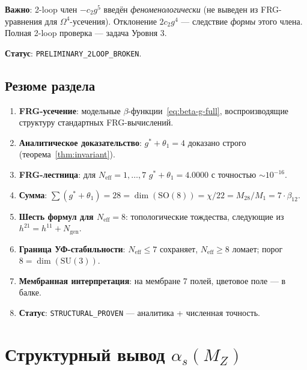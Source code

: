 \documentclass[11pt,a4paper]{article}
\newcommand{\SU}{\ensuremath{\mathrm{SU}}}
\newcommand{\SO}{\ensuremath{\mathrm{SO}}}
\newcommand{\Om}{\ensuremath{\Omega^4}}
\theoremstyle{definition}
\begin{document}
\medskip\noindent
\textbf{Важно}: 2-loop член $-c_2 g^5$ введён \emph{феноменологически}
(не выведен из FRG-уравнения для $\Om$-усечения). Отклонение
$2c_2 g^4$ — следствие \emph{формы} этого члена.
Полная 2-loop проверка — задача Уровня 3.

\medskip\noindent
\textbf{Статус}: \texttt{PRELIMINARY\_2LOOP\_BROKEN}.

\subsection{Резюме раздела}
\label{subsec:frg-summary}

\begin{enumerate}
    \item \textbf{FRG-усечение}: модельные $\beta$-функции~\eqref{eq:beta-g-full},
          воспроизводящие структуру стандартных FRG-вычислений.
    \item \textbf{Аналитическое доказательство}: $g^* + \theta_1 = 4$
          доказано строго (теорема~\ref{thm:invariant}).
    \item \textbf{FRG-лестница}: для $N_{\text{eff}} = 1, \ldots, 7$
          $g^* + \theta_1 = 4.0000$ с точностью $\sim 10^{-16}$.
    \item \textbf{Сумма}: $\sum(g^* + \theta_1) = 28 = \dim(\SO(8)) =
          \chi/22 = M_{28}/M_1 = 7 \cdot \beta_{12}$.
    \item \textbf{Шесть формул для $N_{\text{eff}} = 8$}: топологические
          тождества, следующие из $h^{21} = h^{11} + N_{\text{gen}}$.
    \item \textbf{Граница УФ-стабильности}: $N_{\text{eff}} \le 7$
          сохраняет, $N_{\text{eff}} \ge 8$ ломает; порог
          $8 = \dim(\SU(3))$.
    \item \textbf{Мембранная интерпретация}: на мембране 7 полей,
          цветовое поле --- в балке.
    \item \textbf{Статус}: \texttt{STRUCTURAL\_PROVEN} ---
          аналитика + численная точность.
\end{enumerate}

\section{Структурный вывод \texorpdfstring{$\alpha_s(M_Z)$}{alpha\_s(M\_Z)}}
\label{sec:alphas}
\end{document}
